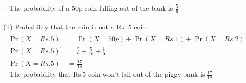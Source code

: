 \documentclass[journal,12pt,twocolumn]{IEEEtran}
\providecommand{\pr}[1]{\ensuremath{\Pr\left(#1\right)}}
\theoremstyle{remark}
\begin{document}
$\therefore$ The probability of a 50p coin falling out of the bank is $\frac{5}{9}$\\
\\
(ii) Probability that the coin is not a Rs. 5 coin:\\
\begin{align}
\pr{X=Rs.5}^\prime &= \pr{X=50p} + \pr{X=Rs.1} + \pr{X=Rs.2}\\
\pr{X=Rs.5}^\prime &= \frac{5}{9} + \frac{5}{18} + \frac{1}{9}\\
\pr{X=Rs.5}^\prime &= \frac{17}{18}
\end{align}
$\therefore$ The probability that Rs.5 coin won't fall out of the piggy bank is $\frac{17}{18}$\\
\end{document}
